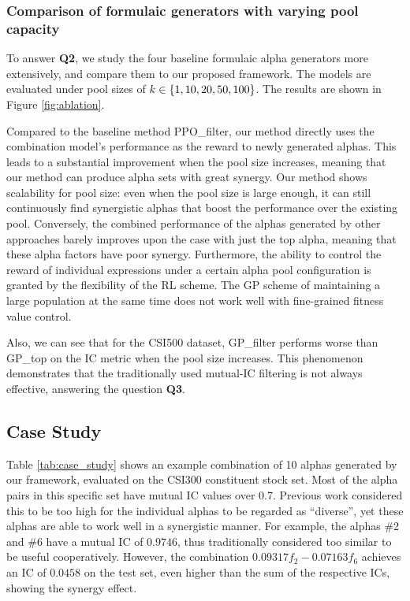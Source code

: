 \subsubsection{Comparison of formulaic generators with varying pool capacity} \label{sec:ablation}

To answer \textbf{Q2}, we study the four baseline formulaic alpha generators more extensively, and compare them to our proposed framework. The models are evaluated under pool sizes of $k \in \left\lbrace 1, 10, 20, 50, 100\right\rbrace$. The results are shown in Figure \ref{fig:ablation}.

Compared to the baseline method PPO\_filter, our method directly uses the combination model's performance as the reward to newly generated alphas. This leads to a substantial improvement when the pool size increases, meaning that our method can produce alpha sets with great synergy. Our method shows scalability for pool size: even when the pool size is large enough, it can still continuously find synergistic alphas that boost the performance over the existing pool. Conversely, the combined performance of the alphas generated by other approaches barely improves upon the case with just the top alpha, meaning that these alpha factors have poor synergy. Furthermore, the ability to control the reward of individual expressions under a certain alpha pool configuration is granted by the flexibility of the RL scheme. The GP scheme of maintaining a large population at the same time does not work well with fine-grained fitness value control.

Also, we can see that for the CSI500 dataset, GP\_filter performs worse than GP\_top on the IC metric when the pool size increases. This phenomenon demonstrates that the traditionally used mutual-IC filtering is not always effective, answering the question \textbf{Q3}.

\subsection{Case Study}

Table \ref{tab:case_study} shows an example combination of 10 alphas generated by our framework, evaluated on the CSI300 constituent stock set. Most of the alpha pairs in this specific set have mutual IC values over 0.7. Previous work \cite{huataigp}\cite{autoalpha} considered this to be too high for the individual alphas to be regarded as ``diverse'', yet these alphas are able to work well in a synergistic manner. For example, the alphas \#2 and \#6 have a mutual IC of $0.9746$, thus traditionally considered too similar to be useful cooperatively. However, the combination $0.09317f_2 - 0.07163f_6$ achieves an IC of $0.0458$ on the test set, even higher than the sum of the respective ICs, showing the synergy effect.

